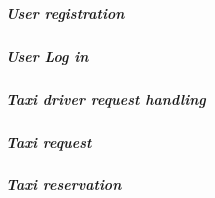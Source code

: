\subparagraph{User registration}
\noindent

\subparagraph{User Log in}
\noindent

\subparagraph{Taxi driver request handling}
\noindent

\subparagraph{Taxi request}
\noindent

\subparagraph{Taxi reservation}
\noindent

